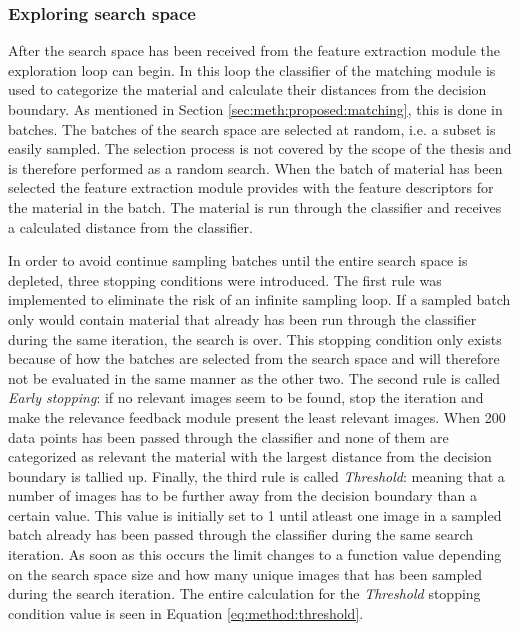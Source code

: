 \subsubsection{Exploring search space}
\label{sec:method:proposed:matching:search}
After the search space has been received from the feature extraction module the exploration loop can begin. In this loop the classifier of the matching module is used to categorize the material and calculate their distances from the decision boundary. As mentioned in Section \ref{sec:meth:proposed:matching}, this is done in batches. The batches of the search space are selected at random, i.e. a subset is easily sampled. The selection process is not covered by the scope of the thesis and is therefore performed as a random search. When the batch of material has been selected the feature extraction module provides with the feature descriptors for the material in the batch. The material is run through the classifier and receives a calculated distance from the classifier. 

In order to avoid continue sampling batches until the entire search space is depleted, three stopping conditions were introduced. The first rule was implemented to eliminate the risk of an infinite sampling loop. If a sampled batch only would contain material that already has been run through the classifier during the same iteration, the search is over. This stopping condition only exists because of how the batches are selected from the search space and will therefore not be evaluated in the same manner as the other two. The second rule is called \emph{Early stopping}: if no relevant images seem to be found, stop the iteration and make the relevance feedback module present the least relevant images. When 200 data points has been passed through the classifier and none of them are categorized as relevant the material with the largest distance from the decision boundary is tallied up. Finally, the third rule is called \emph{Threshold}: meaning that a number of images has to be further away from the decision boundary than a certain value. This value is initially set to 1 until atleast one image in a sampled batch already has been passed through the classifier during the same search iteration. As soon as this occurs the limit changes to a function value depending on the search space size and how many unique images that has been sampled during the search iteration. The entire calculation for the \emph{Threshold} stopping condition value is seen in Equation \ref{eq:method:threshold}.

